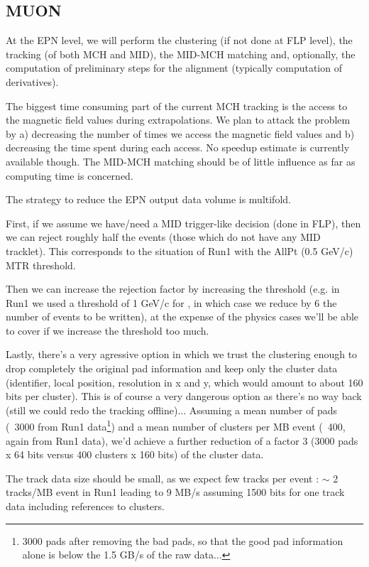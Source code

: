 \subsection{MUON}
\label{MUON:EPN}

At the EPN level, we will perform the clustering (if not done at FLP
level), the tracking (of both MCH and MID), the MID-MCH matching and,
optionally, the computation of preliminary steps for the alignment
(typically computation of derivatives).

The biggest time consuming part of the current MCH tracking is the
access to the magnetic field values during extrapolations. We plan to
attack the problem by a) decreasing the number of times we access the
magnetic field values and b) decreasing the time spent during each
access. No speedup estimate is currently available though. The MID-MCH
matching should be of little influence as far as computing time is
concerned.

The strategy to reduce the EPN output data volume is multifold.

First, if we assume we have/need a MID trigger-like decision (done in
FLP), then we can reject roughly half the events (those which do not
have any MID tracklet). This corresponds to the situation of Run1 with
the AllPt (0.5 GeV/c) MTR \pt threshold.

Then we can increase the rejection factor by increasing the \pt
threshold (e.g. in Run1 we used a threshold of 1 GeV/c for \pbpb, in
which case we reduce by 6 the number of events to be written), at the
expense of the physics cases we'll be able to cover if we increase the
threshold too much.

Lastly, there's a very agressive option in which we trust the
clustering enough to drop completely the original pad information and
keep only the cluster data (identifier, local position, resolution in
x and y, which would amount to about 160 bits per cluster). This is of
course a very dangerous option as there's no way back (still we could
redo the tracking offline)... Assuming a mean number of pads (~3000
from Run1 data\footnote{3000 pads after removing the bad pads, so that the good pad information alone is below the 1.5 GB/s of the raw data...}) 
and a mean number of clusters per MB event (~400,
again from Run1 data), we'd achieve a further reduction of a factor 3
(3000 pads x 64 bits versus 400 clusters x 160 bits) of the cluster
data.

The track data size should be small, as we expect few tracks per event : $\sim$ 2 tracks/MB event in Run1 \pbpb leading to 9 MB/s assuming 1500 bits for one track data including references to clusters.

